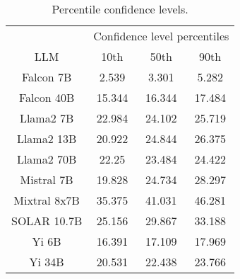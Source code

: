 \begin{table*}
\centering
\begin{tabular}{c|c|c|c}
& \multicolumn{3}{c}{Confidence level percentiles} \\ 
LLM & 10th & 50th & 90th\\ \hline
Falcon 7B & 2.539 & 3.301 & 5.282\\
Falcon 40B & 15.344 & 16.344 & 17.484\\
Llama2 7B & 22.984 & 24.102 & 25.719\\
Llama2 13B & 20.922 & 24.844 & 26.375\\
Llama2 70B & 22.25 & 23.484 & 24.422\\
Mistral 7B & 19.828 & 24.734 & 28.297\\
Mixtral 8x7B & 35.375 & 41.031 & 46.281\\
SOLAR 10.7B & 25.156 & 29.867 & 33.188\\
Yi 6B & 16.391 & 17.109 & 17.969\\
Yi 34B & 20.531 & 22.438 & 23.766\\
\hline
\end{tabular}
\caption{Percentile confidence levels.}
\label{tab:percentile_conf}
\end{table*}
